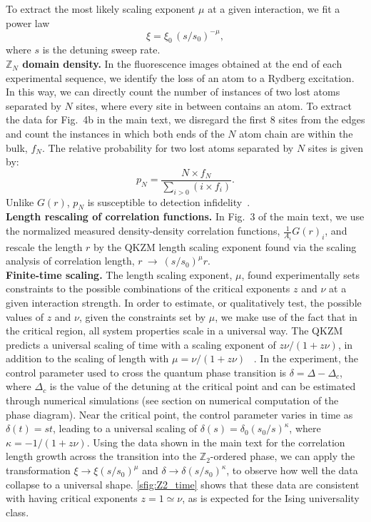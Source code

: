 \documentclass[prl,nobalancelastpage,superscriptaddress,twocolumn,nofootinbib]{revtex4}
\newcommand{\pargap}{\\[12pt]}
\begin{document}
To extract the most likely scaling exponent $\mu$ at a given interaction, we fit a power law
\begin{equation}
    \xi = \xi_0\,(s/s_0)^{-\mu},
\end{equation}
where $s$ is the detuning sweep rate.
\pargap
\noindent\textbf{$\mathbb{Z}_N$ domain density.} In the fluorescence images obtained at the end of each experimental sequence, we identify the loss of an atom to a Rydberg excitation. In this way, we can directly count the number of instances of two lost atoms separated by $N$ sites, where every site in between contains an atom. To extract the data for Fig.~4b in the main text, we disregard the first 8 sites from the edges and count the instances in which both ends of the $N$ atom chain are within the bulk, $f_{N}$. The relative probability for two lost atoms separated by $N$ sites is given by:
\begin{equation}
	p_N = \frac{N\times f_{N}}{\sum_{i>0}(i\times f_{i})}.
\end{equation}
Unlike $G(r)$, $p_{N}$ is susceptible to detection infidelity~\cite{Bernien2017,Levine2018}.
\pargap
\noindent\textbf{Length rescaling of correlation functions.} In Fig.~3 of the main text, we use the normalized measured density-density correlation functions, $\frac{1}{A_{i}}G(r)_{i}$, and rescale the length $r$ by the QKZM length scaling exponent found via the scaling analysis of correlation length, $r~\rightarrow~(s/s_{0})^{\mu}r$.\pargap
\noindent\textbf{Finite-time scaling.} The length scaling exponent, $\mu$, found experimentally sets constraints to the possible combinations of the critical exponents $z$ and $\nu$ at a given interaction strength. In order to estimate, or qualitatively test, the possible values of $z$ and $\nu$, given the constraints set by $\mu$, we make use of the fact that in the critical region, all system properties scale in a universal way. The QKZM predicts a universal scaling of time with a scaling exponent of $z\nu/(1+z\nu)$, in addition to the scaling of length with $\mu = \nu/(1+z\nu)$~\cite{Gerster2018}
. In the experiment, the control parameter used to cross the quantum phase transition is $\delta = \Delta - \Delta_{c}$, where $\Delta_{c}$ is the value of the detuning at the critical point and can be estimated through numerical simulations (see section on numerical computation of the phase diagram). Near the critical point, the control parameter varies in time as $\delta(t) = st$, leading to a universal scaling of $\delta(s) = \delta_0(s_0/s)^{\kappa}$, where $\kappa = -1/(1+z\nu)$. Using the data shown in the main text for the correlation length growth across the transition into the $\mathbb{Z}_{2}$-ordered phase, we can apply the transformation $\xi\rightarrow\xi(s/s_{0})^{\mu}$ and $\delta \rightarrow \delta(s/s_{0})^{\kappa}$, to observe how well the data collapse to a universal shape. \ref{sfig:Z2_time} shows that these data are consistent with having critical exponents $z=1\simeq\nu$, as is expected for the Ising universality class. 
\end{document}
